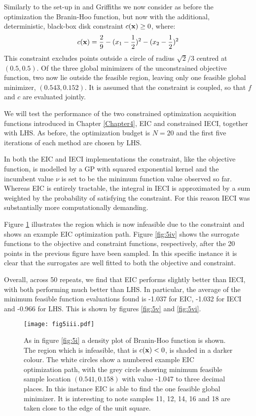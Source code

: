 Similarly to the set-up in \citet{gelbart} and Griffiths \cite{griffiths} we now consider as before the optimization the Branin-Hoo function, but now with the additional, deterministic, black-box disk constraint $c(\mathbf{x}) \geq 0$, where:
%
\begin{equation}
c(\mathbf{x}) = \frac{2}{9} - (x_1 - \frac{1}{2})^2 - (x_2 - \frac{1}{2})^2
\end{equation}
%
This constraint excludes points outside a circle of radius $\sqrt{2}/3$ centred at $(0.5, 0.5)$. Of the three global minimizers of the unconstrained objective function, two now lie outside the feasible region, leaving only one feasible global minimizer, $(0.543, 0.152)$. It is assumed that the constraint is coupled, so that $f$ and $c$ are evaluated jointly.

We will test the performance of the two constrained optimization acquisition functions introduced in Chapter \ref{Chapter4}, EIC and constrained IECI, together with LHS. As before, the optimization budget is $N=20$ and the first five iterations of each method are chosen by LHS. 

In both the EIC and IECI implementations the constraint, like the objective function, is modelled by a GP with squared exponential kernel and the incumbent value $\nu$ is set to be the minimum function value observed so far. Whereas EIC is entirely tractable, the integral in IECI is approximated by a sum weighted by the probability of satisfying the constraint. For this reason IECI was substantially more computationally demanding.

Figure \ref{fig:5iii} illustrates the region which is now infeasible due to the constraint and shows an example EIC optimization path. Figure \ref{fig:5iv} shows the surrogate functions to the objective and constraint functions, respectively, after the 20 points in the previous figure have been sampled. In this specific instance it is clear that the surrogates are well fitted to both the objective and constraint.

Overall, across 50 repeats, we find that EIC performs slightly better than IECI, with both performing much better than LHS. In particular, the average of the minimum feasible function evaluations found is -1.037 for EIC, -1.032 for IECI and -0.966 for LHS. This is shown by figures \ref{fig:5v} and \ref{fig:5vi}. 

\begin{figure}
\centering
\texttt{[image: fig5iii.pdf]}
\caption{As in figure \ref{fig:5i} a density plot of Branin-Hoo function is shown. The region which is infeasible, that is $c(\mathbf{x}) < 0$, is shaded in a darker colour. The white circles show a numbered example EIC optimization path, with the grey circle showing minimum feasible sample location $(0.541, 0.158)$ with value -1.047 to three decimal places. In this instance EIC is able to find the one feasible global minimizer. It is interesting to note samples 11, 12, 14, 16 and 18 are taken close to the edge of the unit square.} \label{fig:5iii}
\end{figure}


